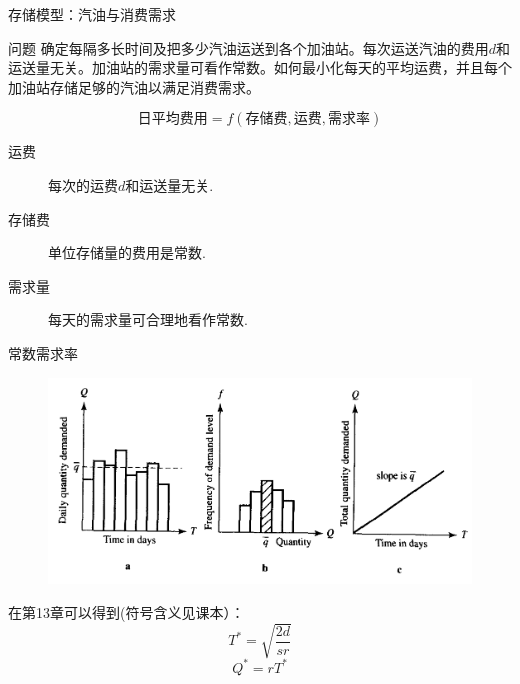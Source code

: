 \documentclass[mathserif, table]{beamer}
\begin{document}
\begin{frame}{存储模型：汽油与消费需求}
  \begin{block}{问题}
    确定每隔多长时间及把多少汽油运送到各个加油站。每次运送汽油的费用$d$和运送量无关。加油站的需求量可看作常数。如何最小化每天的平均运费，并且每个加油站存储足够的汽油以满足消费需求。
  \end{block}
  \[
  \text{日平均费用} = f(\text{存储费}, \text{运费}, \text{需求率})
  \]
  \begin{description}
  \item[运费] 每次的运费$d$和运送量无关.
  \item[存储费] 单位存储量的费用是常数.
  \item[需求量] 每天的需求量可合理地看作常数.
  \end{description}

\end{frame}

\begin{frame}{常数需求率}
  \begin{figure}
    \centering
    \includegraphics[width=.7\textwidth{}]{gas.png}
  \end{figure}

  在第13章可以得到(符号含义见课本）：
  \[
  T^* = \sqrt{\frac{2d}{sr}}
  \]
  \[
  Q^* = rT^*
  \]
\end{frame}
\end{document}
